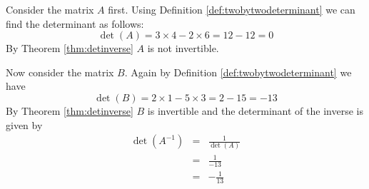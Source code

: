 \begin{solution}
Consider the matrix $A$ first. Using Definition \ref{def:twobytwodeterminant} we can find the determinant as follows:
\[
\det \left( A \right) = 3 \times 4 - 2 \times 6 = 12 - 12 = 0
\]
By Theorem \ref{thm:detinverse} $A$ is not invertible.

Now consider the matrix $B$. Again by Definition \ref{def:twobytwodeterminant} we have 
\[
\det \left( B \right) = 2 \times 1 - 5 \times 3 = 2 - 15 = -13
\]
By Theorem \ref{thm:detinverse} $B$ is invertible and the determinant of the inverse is given by 
\begin{eqnarray*}
\det \left( A^{-1} \right) &=& \frac{1}{\det(A)} \\
&=& \frac{1}{-13} \\
&=& -\frac{1}{13}
\end{eqnarray*}

\end{solution}
